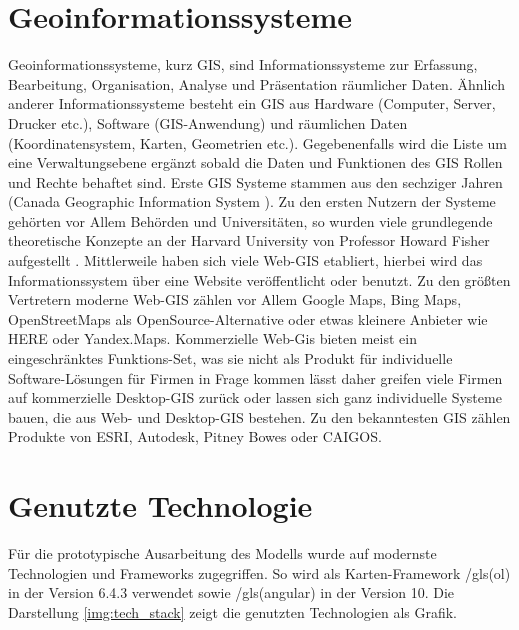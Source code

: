 \section{Geoinformationssysteme}
Geoinformationssysteme, kurz GIS, sind Informationssysteme zur Erfassung, Bearbeitung, Organisation, Analyse und Präsentation räumlicher Daten.  
Ähnlich anderer Informationssysteme besteht ein GIS aus Hardware (Computer, Server, Drucker etc.), Software (GIS-Anwendung) und räumlichen Daten (Koordinatensystem, Karten, Geometrien etc.). 
Gegebenenfalls wird die Liste um eine Verwaltungsebene ergänzt sobald die Daten und Funktionen des GIS Rollen und Rechte behaftet sind.
Erste GIS Systeme stammen aus den sechziger Jahren (Canada Geographic Information System \cite{esriCGIS}). 
Zu den ersten Nutzern der Systeme gehörten vor Allem Behörden und Universitäten, so wurden viele grundlegende theoretische Konzepte an der Harvard University von Professor Howard Fisher aufgestellt \cite{fisher1979}.
Mittlerweile haben sich viele Web-GIS etabliert, hierbei wird das Informationssystem über eine Website veröffentlicht oder benutzt. 
Zu den größten Vertretern moderne Web-GIS zählen vor Allem Google Maps, Bing Maps, OpenStreetMaps als OpenSource-Alternative oder etwas kleinere Anbieter wie HERE oder Yandex.Maps.
Kommerzielle Web-Gis bieten meist ein eingeschränktes Funktions-Set, was sie nicht als Produkt für individuelle Software-Lösungen für Firmen in Frage kommen lässt daher greifen viele Firmen auf kommerzielle Desktop-GIS zurück oder lassen sich ganz individuelle Systeme bauen, die aus Web- und Desktop-GIS bestehen.
Zu den bekanntesten GIS zählen Produkte von ESRI, Autodesk, Pitney Bowes oder CAIGOS. 
\section{Genutzte Technologie}
Für die prototypische Ausarbeitung des Modells wurde auf modernste Technologien und Frameworks zugegriffen. So wird als Karten-Framework /gls(ol) in der Version 6.4.3 verwendet sowie /gls(angular) in der Version 10.
Die Darstellung \ref{img:tech_stack} zeigt die genutzten Technologien als Grafik.

